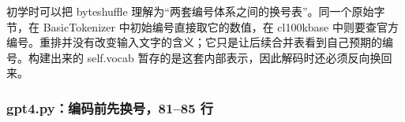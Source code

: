 \documentclass[11pt,a4paper]{article}
\newlength{\BpeDocTableWidth}
\newcommand{\BpeDocCodeInline}[1]{{\ttfamily #1}}
\newcommand{\BpeDocSubsubsection}[2]{\subsubsection{\texorpdfstring{#1}{#2}}}
\begin{document}
初学时可以把 \BpeDocCodeInline{byte\relax\allowbreak{}shuffle} 理解为“两套编号体系之间的换号表”。同一个原始字节，在 \BpeDocCodeInline{BasicTokenizer} 中初始编号直接取它的数值，在 \BpeDocCodeInline{cl100k\relax\allowbreak{}base} 中则要查官方编号。重排并没有改变输入文字的含义；它只是让后续合并表看到自己预期的编号。构建出来的 \BpeDocCodeInline{self.\allowbreak{}vocab} 暂存的是这套内部表示，因此解码时还必须反向换回来。


\BpeDocSubsubsection{\BpeDocCodeInline{gpt4.\allowbreak{}py}：编码前先换号，81–85 行}{gpt4.py：编码前先换号，81–85 行}


\begingroup\fontsize{8.9}{12.2}\selectfont{}
\setlength{\BpeDocTableWidth}{\dimexpr\linewidth-6\tabcolsep\relax}
\renewcommand{\arraystretch}{1.08}
\par\addvspace{0.45em}
\end{document}
